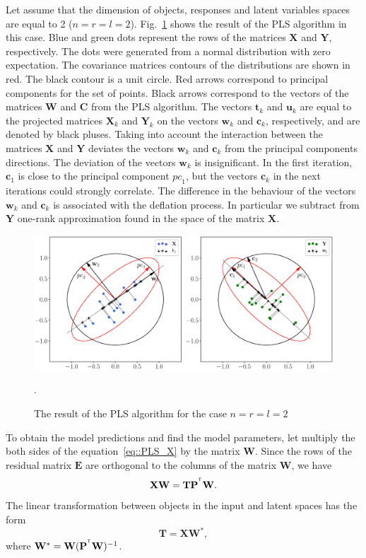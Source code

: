 \documentclass[12pt,twoside]{article}
\newcommand{\bw}{\mathbf{w}}
\newcommand{\bY}{\mathbf{Y}}
\newcommand{\bX}{\mathbf{X}}
\newcommand{\bu}{\mathbf{u}}
\newcommand{\bt}{\mathbf{t}}
\newcommand{\bc}{\mathbf{c}}
\newcommand{\bP}{\mathbf{P}}
\newcommand{\bT}{\mathbf{T}}
\newcommand{\bC}{\mathbf{C}}
\newcommand{\bE}{\mathbf{E}}
\newcommand{\bW}{\mathbf{W}}
\newcommand{\T}{^{\text{\tiny\sffamily\upshape\mdseries T}}}
\begin{document}
Let assume that the dimension of objects, responses and latent variables spaces are equal to 2 ($n = r = l = 2$).
Fig.~\ref{fig::PLSFigure} shows the result of the PLS algorithm in this case.
Blue and green dots represent the rows of the matrices $\bX$ and $\bY$, respectively. 
The dots were generated from a normal distribution with zero expectation. 
The covariance matrices contours of the distributions are shown in red.
The black contour is a unit circle. 
Red arrows correspond to principal components for the set of points. 
Black arrows correspond to the vectors of the matrices $\bW$ and $\bC$ from the PLS algorithm. 
The vectors $\bt_k$ and $\bu_k$ are equal to the projected matrices $\bX_k$ and $\bY_k$ on the vectors $\bw_k$ and $\bc_k$, respectively, and are denoted by black pluses. 
Taking into account the interaction between the matrices $\bX$ and $\bY$ deviates the vectors $\bw_k$ and $\bc_k$ from the principal components directions. 
The deviation of the vectors $\bw_k$ is insignificant. 
In the first iteration, $\bc_1$ is close to the principal component $\textit{pc}_1$, but the vectors $\bc_k$ in the next iterations could strongly correlate. 
The difference in the behaviour of the vectors $\bw_k$ and $\bc_k$ is associated with the deflation process. In particular we subtract from $\bY$ one-rank approximation found in the space of the matrix $\bX$.
\begin{figure}[h]
	\centering
	\includegraphics[width=\linewidth]{figs/PLSFigure.eps}
	\caption{The result of the PLS algorithm for the case $n = r = l = 2$}.
	\label{fig::PLSFigure}
\end{figure}

To obtain the model predictions and find the model parameters, let multiply the both sides of the equation~\eqref{eq::PLS_X} by the matrix $\bW$. Since the rows of the residual matrix  $\bE$ are orthogonal to the columns of the matrix $\bW$, we have
\[
	\bX \bW = \bT \bP^{\T} \bW.
\]
The linear transformation between objects in the input and latent spaces has the form
\begin{equation}
	\bT = \bX \bW^*,
	\label{eq::W*}
\end{equation}
where $\bW^* = \bW (\bP^{\T} \bW)^{-1}$.
\end{document}
